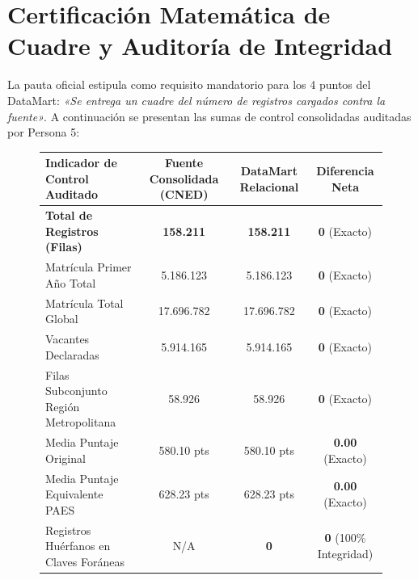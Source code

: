 \documentclass[11pt,a4paper]{article}
\begin{document}
\section{Certificación Matemática de Cuadre y Auditoría de Integridad}
\label{sec:cuadre}

La pauta oficial estipula como requisito mandatorio para los 4 puntos del DataMart: \emph{«Se entrega un cuadre del número de registros cargados contra la fuente»}. A continuación se presentan las sumas de control consolidadas auditadas por Persona 5:

\begin{figure}[h!]
\centering
\begin{tcolorbox}[colback=white, colframe=primaryblue, title=\textbf{Tabla de Control Totals: Fuente Limpia vs. DataMart Físico SQLite}]
\begin{tabularx}{\textwidth}{Xccc}
\toprule
\textbf{Indicador de Control Auditado} & \textbf{Fuente Consolidada (CNED)} & \textbf{DataMart Relacional} & \textbf{Diferencia Neta} \\
\midrule
\textbf{Total de Registros (Filas)} & \textbf{158.211} & \textbf{158.211} & \textbf{0} \textcolor{okgreen}{(Exacto)} \\
Matrícula Primer Año Total & 5.186.123 & 5.186.123 & \textbf{0} \textcolor{okgreen}{(Exacto)} \\
Matrícula Total Global & 17.696.782 & 17.696.782 & \textbf{0} \textcolor{okgreen}{(Exacto)} \\
Vacantes Declaradas & 5.914.165 & 5.914.165 & \textbf{0} \textcolor{okgreen}{(Exacto)} \\
Filas Subconjunto Región Metropolitana & 58.926 & 58.926 & \textbf{0} \textcolor{okgreen}{(Exacto)} \\
Media Puntaje Original & 580.10 pts & 580.10 pts & \textbf{0.00} \textcolor{okgreen}{(Exacto)} \\
Media Puntaje Equivalente PAES & 628.23 pts & 628.23 pts & \textbf{0.00} \textcolor{okgreen}{(Exacto)} \\
Registros Huérfanos en Claves Foráneas & N/A & \textbf{0} & \textbf{0} \textcolor{okgreen}{(100\% Integridad)} \\
\bottomrule
\end{tabularx}
\end{tcolorbox}
\end{figure}

\end{document}
